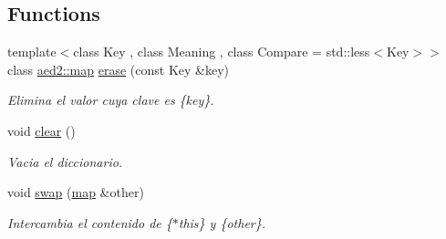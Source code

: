 \subsection*{\-Functions}
\begin{DoxyCompactItemize}
\item 
{\footnotesize template$<$class Key , class Meaning , class Compare  = std\-::less$<$\-Key$>$$>$ }\\class \hyperlink{classaed2_1_1map}{aed2\-::map} \hyperlink{namespaceaed2_af94e184e6463abb6f7f5237afd0d808a}{erase} (const \-Key \&key)
\begin{DoxyCompactList}\small\item\em \-Elimina el valor cuya clave es \{key\}. \end{DoxyCompactList}\item 
void \hyperlink{namespaceaed2_ac055546b287d4b50772e8b4e9d188ed2}{clear} ()
\begin{DoxyCompactList}\small\item\em \-Vacia el diccionario. \end{DoxyCompactList}\item 
void \hyperlink{namespaceaed2_ab24ac4be44835194ce27a61969e4a292}{swap} (\hyperlink{classaed2_1_1map}{map} \&other)
\begin{DoxyCompactList}\small\item\em \-Intercambia el contenido de \{$\ast$this\} y \{other\}. \end{DoxyCompactList}\end{DoxyCompactItemize}
